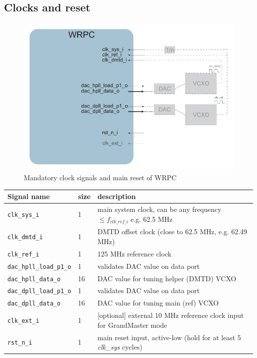 \subsection{Clocks and reset}
\label{basic:clk_rst}

\begin{figure}[ht]
  \begin{center}
    \includegraphics[width=.8\textwidth]{fig/basic_wrpc_clk.pdf}
    \caption{Mandatory clock signals and main reset of WRPC}
  \end{center}
\end{figure}


\begin{center}
  \begin{tabular}{|l|l|p{9cm}|}
    \hline
    {\bf Signal name} & {\bf size} & {\bf description} \\
    \hline \hline
    \texttt{clk\_sys\_i} & 1 & main system clock, can be any frequency $\leq
    f_{clk\_ref\_i}$ e.g. 62.5 MHz\\
    \texttt{clk\_dmtd\_i} & 1 & DMTD offset clock (close to 62.5 MHz, e.g. 62.49 MHz)\\
    \texttt{clk\_ref\_i} & 1 & 125 MHz reference clock\\
    \hline
    \texttt{dac\_hpll\_load\_p1\_o} & 1 & validates DAC value on data port \\
    \texttt{dac\_hpll\_data\_o} & 16 & DAC value for tuning helper (DMTD) VCXO\\
    \texttt{dac\_dpll\_load\_p1\_o} & 1 & validates DAC value on data port \\
    \texttt{dac\_dpll\_data\_o} & 16 & DAC value for tuning main (ref) VCXO\\
    \hline
    \texttt{clk\_ext\_i} & 1 & [optional] external 10 MHz reference clock
    input for GrandMaster mode\\
    \texttt{rst\_n\_i} & 1 & main reset input, active-low (hold for at least 5
    \emph{clk\_sys} cycles)\\
    \hline
  \end{tabular}
\end{center}
